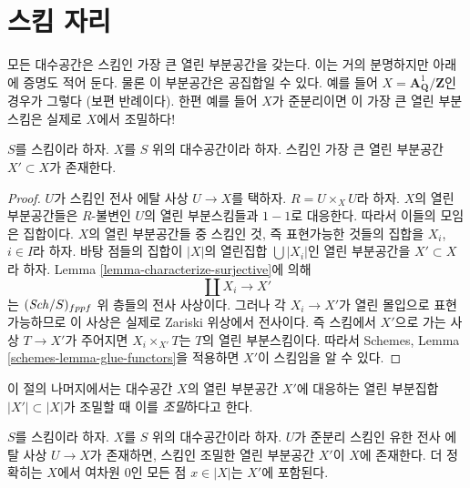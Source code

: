 \section{스킴 자리}
\label{section-schematic}

\noindent
모든 대수공간은 스킴인 가장 큰 열린 부분공간을 갖는다. 이는 거의
분명하지만 아래에 증명도 적어 둔다. 물론 이 부분공간은 공집합일 수 있다.
예를 들어 $X = \mathbf{A}^1_{\mathbf{Q}}/\mathbf{Z}$인 경우가 그렇다
(보편 반례이다). 한편 예를 들어 $X$가 준분리이면 이 가장 큰 열린
부분스킴은 실제로 $X$에서 조밀하다!

\begin{lemma}
\label{lemma-subscheme}
$S$를 스킴이라 하자.
$X$를 $S$ 위의 대수공간이라 하자.
스킴인 가장 큰 열린 부분공간 $X' \subset X$가 존재한다.
\end{lemma}

\begin{proof}
$U$가 스킴인 전사 에탈 사상 $U \to X$를 택하자.
$R = U \times_X U$라 하자. $X$의 열린 부분공간들은 $R$-불변인
$U$의 열린 부분스킴들과 $1 - 1$로 대응한다. 따라서 이들의 모임은
집합이다. $X$의 열린 부분공간들 중 스킴인 것, 즉 표현가능한 것들의
집합을 $X_i$, $i \in I$라 하자. 바탕 점들의 집합이 $|X|$의 열린집합
$\bigcup |X_i|$인 열린 부분공간을 $X' \subset X$라 하자. Lemma
\ref{lemma-characterize-surjective}에 의해
$$
\coprod X_i \longrightarrow X'
$$
는 $(\mathit{Sch}/S)_{fppf}$ 위 층들의 전사 사상이다. 그러나 각
$X_i \to X'$가 열린 몰입으로 표현가능하므로 이 사상은 실제로
Zariski 위상에서 전사이다. 즉 스킴에서 $X'$으로 가는 사상
$T \to X'$가 주어지면 $X_i \times_{X'} T$는 $T$의 열린 부분스킴이다.
따라서 Schemes, Lemma \ref{schemes-lemma-glue-functors}을 적용하면
$X'$이 스킴임을 알 수 있다.
\end{proof}

\noindent
이 절의 나머지에서는 대수공간 $X$의 열린 부분공간 $X'$에 대응하는
열린 부분집합 $|X'| \subset |X|$가 조밀할 때 이를 {\it 조밀}하다고 한다.

\begin{lemma}
\label{lemma-quasi-separated-finite-etale-cover-dense-open-scheme}
$S$를 스킴이라 하자. $X$를 $S$ 위의 대수공간이라 하자.
$U$가 준분리 스킴인 유한 전사 에탈 사상 $U \to X$가 존재하면,
스킴인 조밀한 열린 부분공간 $X'$이 $X$에 존재한다.
더 정확히는 $X$에서 여차원 $0$인 모든 점 $x \in |X|$는 $X'$에 포함된다.
\end{lemma}


